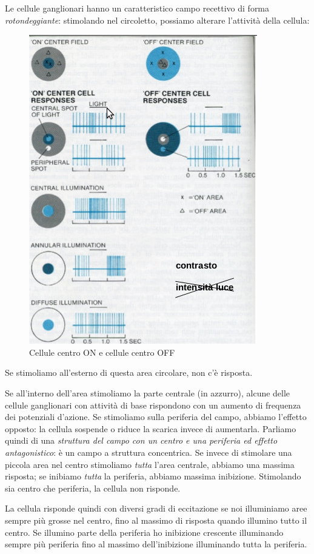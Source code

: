 \documentclass[a4paper,12pt]{article}
\begin{document}
Le cellule ganglionari hanno un caratteristico campo recettivo di forma \emph{rotondeggiante}: stimolando nel circoletto, possiamo alterare l'attività della cellula:
\begin{figure}[H]
\centering
\includegraphics[scale=0.4]{immagine/cerchio.jpg}
\caption{Cellule centro ON e cellule centro OFF}
\end{figure}

Se stimoliamo all'esterno di questa area circolare, non c'è risposta.

Se all'interno dell'area stimoliamo la parte centrale (in  azzurro), alcune delle cellule ganglionari con attività di base rispondono con un aumento di frequenza dei potenziali d'azione. Se stimoliamo sulla periferia del campo, abbiamo l'effetto opposto: la cellula sospende o riduce la scarica invece di aumentarla. Parliamo quindi di una \emph{struttura del campo con un centro e una periferia ed effetto antagonistico}: è un campo a struttura concentrica. Se invece di stimolare una piccola area nel centro stimoliamo \emph{tutta} l'area centrale, abbiamo una massima risposta; se inibiamo \emph{tutta} la periferia, abbiamo massima inibizione. Stimolando sia centro che periferia, la cellula non  risponde.
 
La cellula risponde quindi con diversi gradi di eccitazione se noi illuminiamo aree sempre più grosse nel centro, fino al massimo di risposta quando illumino tutto il centro. Se illumino parte della periferia ho inibizione crescente illuminando sempre più periferia fino al massimo dell'inibizione illuminando tutta la periferia. 
\end{document}
